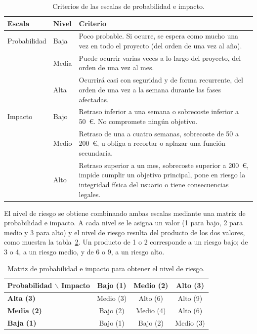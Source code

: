 	\begin{table}[htbp]
		\centering
		\caption{Criterios de las escalas de probabilidad e impacto.}
		\label{tab:escalas-riesgo}
		\small
		\begin{tabularx}{\textwidth}{@{}l>{\raggedright\arraybackslash}p{1.4cm}X@{}}
			\toprule
			\textbf{Escala} & \textbf{Nivel} & \textbf{Criterio} \\
			\midrule
			Probabilidad & Baja &
			Poco probable. Si ocurre, se espera como mucho una vez en todo el proyecto (del orden de una vez al año). \\
			& Media &
			Puede ocurrir varias veces a lo largo del proyecto, del orden de una vez al mes. \\
			& Alta &
			Ocurrirá casi con seguridad y de forma recurrente, del orden de una vez a la semana durante las fases afectadas. \\
			\midrule
			Impacto & Bajo &
			Retraso inferior a una semana o sobrecoste inferior a 50~€. No compromete ningún objetivo. \\
			& Medio &
			Retraso de una a cuatro semanas, sobrecoste de 50 a 200~€, u obliga a recortar o aplazar una función secundaria. \\
			& Alto &
			Retraso superior a un mes, sobrecoste superior a 200~€, impide cumplir un objetivo principal, pone en riesgo la integridad física del usuario o tiene consecuencias legales. \\
			\bottomrule
		\end{tabularx}
	\end{table}
	
	El nivel de riesgo se obtiene combinando ambas escalas mediante una matriz de probabilidad e impacto. A cada nivel se le asigna un valor (1 para bajo, 2 para medio y 3 para alto) y el nivel de riesgo resulta del producto de los dos valores, como muestra la tabla~\ref{tab:matriz-riesgo}. Un producto de 1 o 2 corresponde a un riesgo bajo; de 3 o 4, a un riesgo medio, y de 6 o 9, a un riesgo alto.
	
	\begin{table}[htbp]
		\centering
		\caption{Matriz de probabilidad e impacto para obtener el nivel de riesgo.}
		\label{tab:matriz-riesgo}
		\small
		\begin{tabular}{@{}lccc@{}}
			\toprule
			\textbf{Probabilidad} $\backslash$ \textbf{Impacto} & \textbf{Bajo (1)} & \textbf{Medio (2)} & \textbf{Alto (3)} \\
			\midrule
			\textbf{Alta (3)}  & Medio (3) & Alto (6)  & Alto (9) \\
			\textbf{Media (2)} & Bajo (2)  & Medio (4) & Alto (6) \\
			\textbf{Baja (1)}  & Bajo (1)  & Bajo (2)  & Medio (3) \\
			\bottomrule
		\end{tabular}
	\end{table}
	
